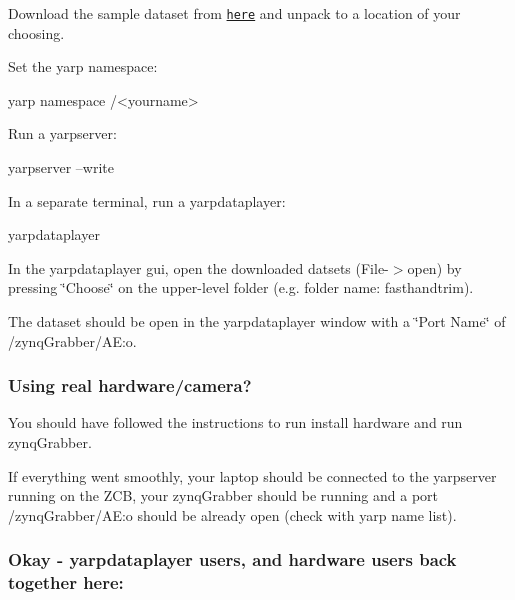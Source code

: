\begin{DoxyItemize}
\item Download the sample dataset from \href{https://doi.org/10.5281/zenodo.2556755}{\tt here} and unpack to a location of your choosing.
\item Set the yarp namespace\+: 
\begin{DoxyCode}
yarp namespace /<yourname>
\end{DoxyCode}

\item Run a yarpserver\+: 
\begin{DoxyCode}
yarpserver --write
\end{DoxyCode}

\item In a separate terminal, run a yarpdataplayer\+: 
\begin{DoxyCode}
yarpdataplayer
\end{DoxyCode}

\item In the yarpdataplayer gui, open the downloaded datsets (File-\/$>$open) by pressing \char`\"{}\+Choose\char`\"{} on the upper-\/level folder (e.\+g. folder name\+: fasthandtrim).
\item The dataset should be open in the yarpdataplayer window with a \char`\"{}\+Port Name\char`\"{} of {\ttfamily /zynq\+Grabber/\+AE\+:o}.
\end{DoxyItemize}

\subsubsection*{Using real hardware/camera?}


\begin{DoxyItemize}
\item You should have followed the instructions to run install hardware and run zynq\+Grabber.
\item If everything went smoothly, your laptop should be connected to the {\ttfamily yarpserver} running on the Z\+CB, your zynq\+Grabber should be running and a port {\ttfamily /zynq\+Grabber/\+AE\+:o} should be already open (check with {\ttfamily yarp name list}).
\end{DoxyItemize}

\subsubsection*{Okay -\/ yarpdataplayer users, and hardware users back together here\+:}



